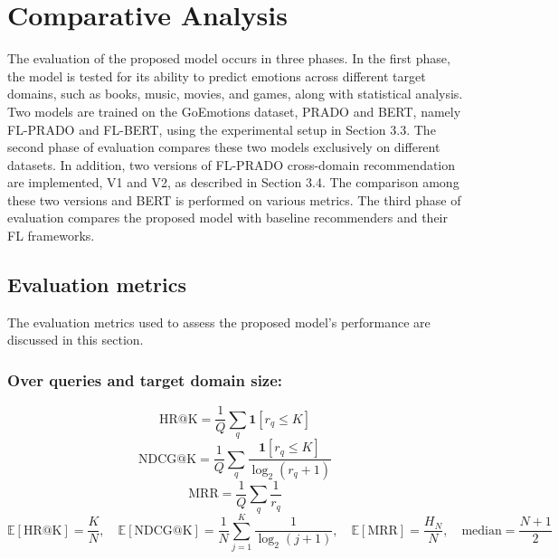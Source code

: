 \chapter{Comparative Analysis}
The evaluation of the proposed model occurs in three phases. In the first phase, the model is tested for its ability to predict emotions across different target domains, such as books, music, movies, and games, along with statistical analysis. Two models are trained on the GoEmotions dataset, PRADO and BERT, namely FL-PRADO and FL-BERT, using the experimental setup in Section 3.3. The second phase of evaluation compares these two models exclusively on different datasets. In addition, two versions of FL-PRADO cross-domain recommendation are implemented, V1 and V2, as described in Section 3.4. The comparison among these two versions and BERT is performed on various metrics. The third phase of evaluation compares the proposed model with baseline recommenders and their FL frameworks.

\section{Evaluation metrics}
The evaluation metrics used to assess the proposed model’s performance are discussed in this section.

\subsection{Over queries and target domain size:}
\begin{equation}
  \text{HR@K} = \frac{1}{Q} \sum_{q} \mathbf{1}\left[ r_{q} \leq K \right]
  \label{eq:ch5_4_21}
\end{equation}
\begin{equation}
  \text{NDCG@K} = \frac{1}{Q} \sum_{q} \frac{\mathbf{1}\left[ r_{q} \leq K \right]}{\log_{2}(r_{q} + 1)}
  \label{eq:ch5_4_22}
\end{equation}
\begin{equation}
  \text{MRR} = \frac{1}{Q} \sum_{q} \frac{1}{r_{q}}
  \label{eq:ch5_4_23}
\end{equation}
\begin{equation}
  \mathbb{E}[\text{HR@K}] = \frac{K}{N}, \quad \mathbb{E}[\text{NDCG@K}] = \frac{1}{N} \sum_{j=1}^{K} \frac{1}{\log_{2}(j+1)}, \quad \mathbb{E}[\text{MRR}] = \frac{H_{N}}{N}, \quad \text{median} = \frac{N+1}{2}
  \label{eq:ch5_4_24}
\end{equation}

